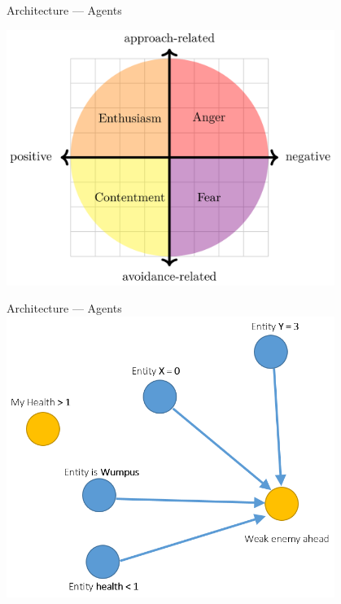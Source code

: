    \begin{frame}{Architecture --- Agents}
      \begin{center}
         \includegraphics[width=0.8\textwidth]{../Thesis/Figs/PSBC.png}
      \end{center}
   \end{frame}
   
   \begin{frame}{Architecture --- Agents}
      \includegraphics[width=0.8\textwidth]{anger_filter.png}
   \end{frame}
   
